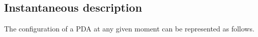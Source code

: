 \subsection{Instantaneous description}
The configuration of a PDA at any given moment can be represented as follows.
